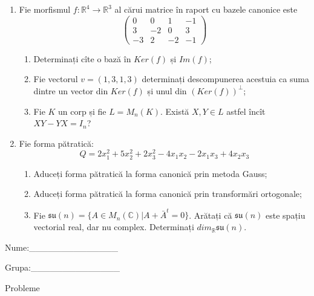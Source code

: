 \documentclass{article}
\begin{document}
\begin{enumerate}
 \item Fie morfismul $f:\mathbb{R}^4 \to \mathbb{R}^3$ al cărui matrice în raport cu bazele canonice este
$$\begin{pmatrix}
0&0&1&-1\\
3&-2&0&3\\
-3&2&-2&-1
\end{pmatrix}$$

\begin{enumerate}
\item Determinați cîte o bază în $Ker(f)$ și $Im(f)$;
\item Fie vectorul $v=(1,3,1,3)$ determinați descompunerea acestuia ca suma dintre un vector din $Ker(f)$ și unul din $(Ker(f))^\perp$;
\item Fie $K$ un corp și fie $L=M_n(K)$. Există $X,Y \in L$ astfel încît $XY-YX=I_n$?  
\end{enumerate}
\item Fie forma pătratică:
$$Q= 2x_1^2+5x_2^2+2x_3^2-4x_1x_2-2x_1x_3+4x_2x_3$$

\begin{enumerate}
\item Aduceți forma pătratică la forma canonică prin metoda Gauss;
\item Aduceți forma pătratică la forma canonică prin transformări ortogonale;
\item Fie $\mathfrak{su}(n)=\{ A \in M_n(\mathbb{C}) | A+\bar{A}^t=0\}$. Arătați că $\mathfrak{su}(n)$ este spațiu vectorial real, dar nu complex.
Determinați $dim_{\mathbb{R}}\mathfrak{su}(n)$.
\end{enumerate}
\end{enumerate}
\newpage
\begin{flushright}
Nume:\_\_\_\_\_\_\_\_\_\_\_\_\_\_
 
 
Grupa:\_\_\_\_\_\_\_\_\_\_\_\_\_\_
\end{flushright}
\begin{center}
\vspace{2cm}
{\Large Probleme}
\vspace{2cm}
\end{center}
\end{document}
